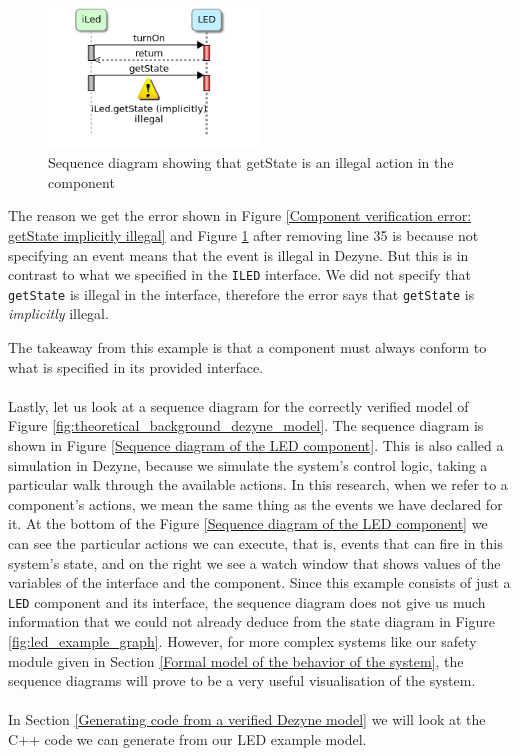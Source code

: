 \documentclass[12pt]{scrreprt}
\begin{document}
\begin{figure}[H]
    \centering
    \includegraphics[width=0.5\textwidth]{Figures/theoretical_background/getState_implicitly_illegal.png}
    \caption{Sequence diagram showing that getState is an illegal action in the component}
    \label{Sequence diagram showing that the component does not conform to the interface}
\end{figure}

The reason we get the error shown in Figure \ref{Component verification error: getState implicitly illegal} and Figure \ref{Sequence diagram showing that the component does not conform to the interface} after removing line 35 is because not specifying an event means that the event is illegal in Dezyne. But this is in contrast to what we specified in the \texttt{ILED} interface. We did not specify that \texttt{getState} is illegal in the interface, therefore the error says that \texttt{getState} is \textit{implicitly} illegal.
\par
The takeaway from this example is that a component must always conform to what is specified in its provided interface.
\\\\
Lastly, let us look at a sequence diagram for the correctly verified model of Figure \ref{fig:theoretical_background_dezyne_model}. The sequence diagram is shown in Figure \ref{Sequence diagram of the LED component}. This is also called a simulation in Dezyne, because we simulate the system's control logic, taking a particular walk through the available actions. In this research, when we refer to a component's actions, we mean the same thing as the events we have declared for it. At the bottom of the Figure \ref{Sequence diagram of the LED component} we can see the particular actions we can execute, that is, events that can fire in this system's state, and on the right we see a watch window that shows values of the variables of the interface and the component. Since this example consists of just a \texttt{LED} component and its interface, the sequence diagram does not give us much information that we could not already deduce from the state diagram in Figure \ref{fig:led_example_graph}. However, for more complex systems like our safety module given in Section \ref{Formal model of the behavior of the system}, the sequence diagrams will prove to be a very useful visualisation of the system.
\\\\
In Section \ref{Generating code from a verified Dezyne model} we will look at the C++ code we can generate from our LED example model.
\end{document}
